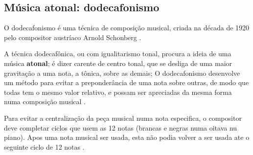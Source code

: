 \subsection{Música atonal: dodecafonismo}
\label{sec:MusicaAtonal}
O dodecafonismo é uma técnica de composição musical, 
criada na década de 1920 pelo compositor austríaco Arnold Schonberg \cite[pp. 121]{arbones2012armonia}\cite[pp. 263]{holst1998abc}.


A técnica dodecafônica, ou com igualitarismo tonal,
procura a ideia de uma música \textbf{atonal}; é dizer carente de centro tonal,
que se desliga de uma maior gravitação a uma nota, a tônica, sobre as demais;
O dodecafonismo desenvolve um método para evitar a preponderância de uma nota sobre outras,
de modo que todas tem o mesmo valor relativo,
e possam ser apreciadas da mesma forma numa composição musical 
\cite[pp. 122]{arbones2012armonia}.

Para evitar a centralização da peça musical numa nota especifica,
o compositor deve completar ciclos que usem as 12 notas 
(brancas e negras numa oitava nu piano). 
Apos uma nota musical ser usada, 
esta não podia volver a ser usada ate o seguinte ciclo de 12 notas \cite[pp. 123]{arbones2012armonia}.


